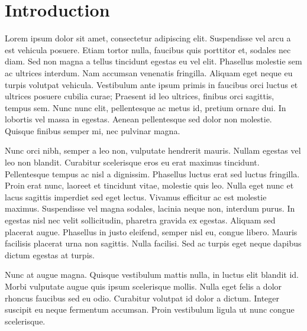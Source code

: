 \chapter*{Introduction}
\label{ch:introduction}
 Lorem ipsum dolor sit amet, consectetur adipiscing elit. Suspendisse vel arcu a est vehicula posuere. Etiam tortor nulla, faucibus quis porttitor et, sodales nec diam. Sed non magna a tellus tincidunt egestas eu vel elit. Phasellus molestie sem ac ultrices interdum. Nam accumsan venenatis fringilla. Aliquam eget neque eu turpis volutpat vehicula. Vestibulum ante ipsum primis in faucibus orci luctus et ultrices posuere cubilia curae; Praesent id leo ultrices, finibus orci sagittis, tempus sem. Nunc nunc elit, pellentesque ac metus id, pretium ornare dui. In lobortis vel massa in egestas. Aenean pellentesque sed dolor non molestie. Quisque finibus semper mi, nec pulvinar magna.

Nunc orci nibh, semper a leo non, vulputate hendrerit mauris. Nullam egestas vel leo non blandit. Curabitur scelerisque eros eu erat maximus tincidunt. Pellentesque tempus ac nisl a dignissim. Phasellus luctus erat sed luctus fringilla. Proin erat nunc, laoreet et tincidunt vitae, molestie quis leo. Nulla eget nunc et lacus sagittis imperdiet sed eget lectus. Vivamus efficitur ac est molestie maximus. Suspendisse vel magna sodales, lacinia neque non, interdum purus. In egestas nisl nec velit sollicitudin, pharetra gravida ex egestas. Aliquam sed placerat augue. Phasellus in justo eleifend, semper nisl eu, congue libero. Mauris facilisis placerat urna non sagittis. Nulla facilisi. Sed ac turpis eget neque dapibus dictum egestas at turpis.

Nunc at augue magna. Quisque vestibulum mattis nulla, in luctus elit blandit id. Morbi vulputate augue quis ipsum scelerisque mollis. Nulla eget felis a dolor rhoncus faucibus sed eu odio. Curabitur volutpat id dolor a dictum. Integer suscipit eu neque fermentum accumsan. Proin vestibulum ligula ut nunc congue scelerisque. 
